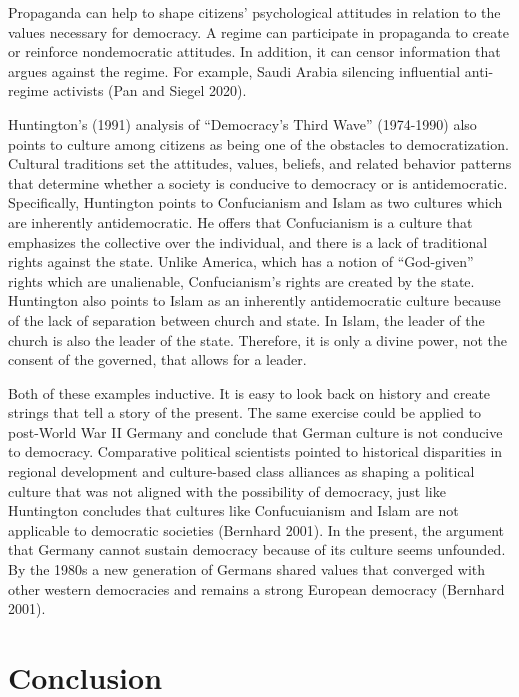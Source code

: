 \documentclass[12pt,]{article}
\begin{document}
Propaganda can help to shape citizens' psychological attitudes in
relation to the values necessary for democracy. A regime can participate
in propaganda to create or reinforce nondemocratic attitudes. In
addition, it can censor information that argues against the regime. For
example, Saudi Arabia silencing influential anti-regime activists (Pan
and Siegel 2020).

Huntington's (1991) analysis of ``Democracy's Third Wave'' (1974-1990)
also points to culture among citizens as being one of the obstacles to
democratization. Cultural traditions set the attitudes, values, beliefs,
and related behavior patterns that determine whether a society is
conducive to democracy or is antidemocratic. Specifically, Huntington
points to Confucianism and Islam as two cultures which are inherently
antidemocratic. He offers that Confucianism is a culture that emphasizes
the collective over the individual, and there is a lack of traditional
rights against the state. Unlike America, which has a notion of
``God-given'' rights which are unalienable, Confucianism's rights are
created by the state. Huntington also points to Islam as an inherently
antidemocratic culture because of the lack of separation between church
and state. In Islam, the leader of the church is also the leader of the
state. Therefore, it is only a divine power, not the consent of the
governed, that allows for a leader.

Both of these examples inductive. It is easy to look back on history and
create strings that tell a story of the present. The same exercise could
be applied to post-World War II Germany and conclude that German culture
is not conducive to democracy. Comparative political scientists pointed
to historical disparities in regional development and culture-based
class alliances as shaping a political culture that was not aligned with
the possibility of democracy, just like Huntington concludes that
cultures like Confucuianism and Islam are not applicable to democratic
societies (Bernhard 2001). In the present, the argument that Germany
cannot sustain democracy because of its culture seems unfounded. By the
1980s a new generation of Germans shared values that converged with
other western democracies and remains a strong European democracy
(Bernhard 2001).

\hypertarget{conclusion}{%
\section{Conclusion}\label{conclusion}}
\end{document}
